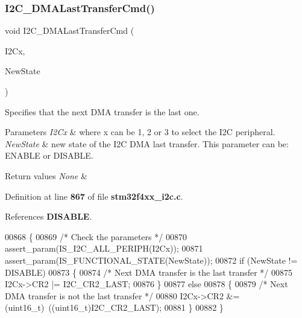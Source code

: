 \subsubsection{I2\+C\+\_\+\+D\+M\+A\+Last\+Transfer\+Cmd()}
{\footnotesize\ttfamily void I2\+C\+\_\+\+D\+M\+A\+Last\+Transfer\+Cmd (\begin{DoxyParamCaption}\item[{\textbf{ I2\+C\+\_\+\+Type\+Def} $\ast$}]{I2\+Cx,  }\item[{\textbf{ Functional\+State}}]{New\+State }\end{DoxyParamCaption})}



Specifies that the next D\+MA transfer is the last one. 


\begin{DoxyParams}{Parameters}
{\em I2\+Cx} & where x can be 1, 2 or 3 to select the I2C peripheral. \\
\hline
{\em New\+State} & new state of the I2C D\+MA last transfer. This parameter can be\+: E\+N\+A\+B\+LE or D\+I\+S\+A\+B\+LE. \\
\hline
\end{DoxyParams}

\begin{DoxyRetVals}{Return values}
{\em None} & \\
\hline
\end{DoxyRetVals}


Definition at line \textbf{ 867} of file \textbf{ stm32f4xx\+\_\+i2c.\+c}.



References \textbf{ D\+I\+S\+A\+B\+LE}.


\begin{DoxyCode}
00868 \{
00869   \textcolor{comment}{/* Check the parameters */}
00870   assert_param(IS_I2C_ALL_PERIPH(I2Cx));
00871   assert_param(IS_FUNCTIONAL_STATE(NewState));
00872   \textcolor{keywordflow}{if} (NewState != DISABLE)
00873   \{
00874     \textcolor{comment}{/* Next DMA transfer is the last transfer */}
00875     I2Cx->CR2 |= I2C_CR2_LAST;
00876   \}
00877   \textcolor{keywordflow}{else}
00878   \{
00879     \textcolor{comment}{/* Next DMA transfer is not the last transfer */}
00880     I2Cx->CR2 &= (uint16\_t)~((uint16\_t)I2C_CR2_LAST);
00881   \}
00882 \}
\end{DoxyCode}

